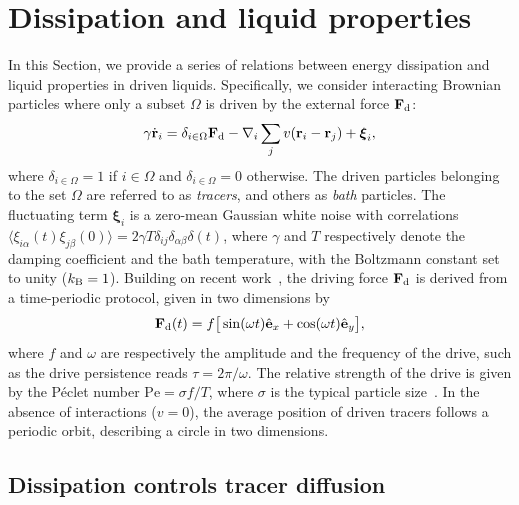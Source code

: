 \documentclass[superscriptaddress, twocolumn, prx, longbibliography, nofootinbib]{revtex4-1}
\begin{document}
\section{Dissipation and liquid properties}\label{sec:method}

In this Section, we provide a series of relations between energy dissipation and liquid properties in driven liquids. Specifically, we consider interacting Brownian particles where only a subset $\Omega$ is driven by the external force ${\bf F}_{\rm d}$:
\begin{equation}\label{eq:dyn}
	\gamma\dot{\bf r}_i = \delta_{i\in\Omega}{\bf F}_{\rm d} - \nabla_i \sum_j v({\bf r}_i-{\bf r}_j) + {\boldsymbol\xi}_i ,
\end{equation}
where $\delta_{i\in\Omega}=1$ if $i\in\Omega$ and $\delta_{i\in\Omega}=0$ otherwise. The driven particles belonging to the set $\Omega$ are referred to as {\it tracers}, and others as {\it bath} particles. The fluctuating term ${\boldsymbol\xi}_i$ is a zero-mean Gaussian white noise with correlations $\langle\xi_{i\alpha}(t)\xi_{j\beta}(0)\rangle=2\gamma T\delta_{ij}\delta_{\alpha\beta}\delta(t)$, where $\gamma$ and $T$ respectively denote the damping coefficient and the bath temperature, with the Boltzmann constant set to unity ($k_{\rm B}=1$). Building on recent work~\cite{Han2016, delJunco2018}, the driving force ${\bf F}_\text{d}$ is derived from a time-periodic protocol, given in two dimensions by
\begin{equation}\label{eq:theta}
	{\bf F}_{\rm d}(t) = f \big[\sin(\omega t) \hat{\bf e}_x + \cos(\omega t)\hat{\bf e}_y \big] ,
\end{equation}
where $f$ and $\omega$ are respectively the amplitude and the frequency of the drive, such as the drive persistence reads $\tau=2\pi/\omega$. The relative strength of the drive is given by the P\'eclet number $\text{Pe} = \sigma f/T$, where $\sigma$ is the typical particle size~\cite{Han2016, delJunco2018}. In the absence of interactions ($v=0$), the average position of driven tracers follows a periodic orbit, describing a circle in two dimensions.




\subsection{Dissipation controls tracer diffusion}
\end{document}

